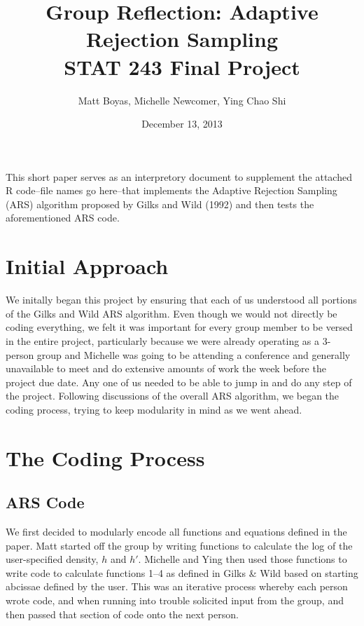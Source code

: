 \documentclass{article}
\begin{document}
\lstset{language=R, basicstyle=\ttfamily, columns=flexible}
    
\title{Group Reflection: Adaptive Rejection Sampling\\STAT 243 Final Project}
\author{Matt Boyas, Michelle Newcomer, Ying Chao Shi}

\date{December 13, 2013}
\maketitle
This short paper serves as an interpretory document to supplement the attached R code--file names go here--that implements the Adaptive Rejection Sampling (ARS) algorithm proposed by Gilks and Wild (1992) and then tests the aforementioned ARS code.
\section{Initial Approach}
We initally began this project by ensuring that each of us understood all portions of the Gilks and Wild ARS algorithm.  Even though we would not directly be coding everything, we felt it was important for every group member to be versed in the entire project, particularly because we were already operating as a 3-person group and Michelle was going to be attending a conference and generally unavailable to meet and do extensive amounts of work the week before the project due date.  Any one of us needed to be able to jump in and do any step of the project.  Following discussions of the overall ARS algorithm, we began the coding process, trying to keep modularity in mind as we went ahead. 
 
\section{The Coding Process}
\subsection{ARS Code}
We first decided to modularly encode all functions and equations defined in the paper.  Matt started off the group by writing functions to calculate the log of the user-specified density, $h$ and $h'$.  Michelle and Ying then used those functions to write code to calculate functions 1--4 as defined in Gilks \& Wild based on starting abcissae defined by the user. This was an iterative process whereby each person wrote code, and when running into trouble solicited input from the group, and then passed that section of code onto the next person. 
\end{document}
